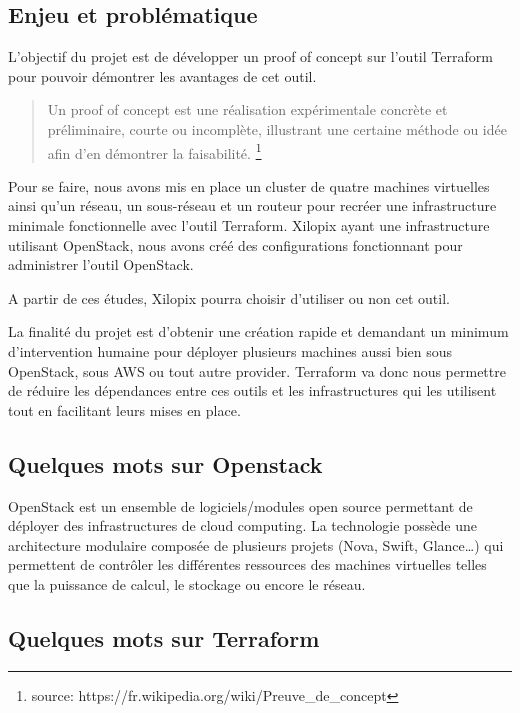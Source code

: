 \documentclass[]{article}
\begin{document}
\subsection{Enjeu et problématique}\label{enjeu-et-probluxe9matique}

L'objectif du projet est de développer un proof of concept sur l'outil
Terraform pour pouvoir démontrer les avantages de cet outil.

\begin{quote}
Un proof of concept est une réalisation expérimentale concrète et
préliminaire, courte ou incomplète, illustrant une certaine méthode ou
idée afin d'en démontrer la faisabilité. \footnote{source: https://fr.wikipedia.org/wiki/Preuve\_de\_concept}
\end{quote}

Pour se faire, nous avons mis en place un cluster de quatre machines
virtuelles ainsi qu'un réseau, un sous-réseau et un routeur pour recréer
une infrastructure minimale fonctionnelle avec l'outil Terraform.
Xilopix ayant une infrastructure utilisant OpenStack, nous avons créé
des configurations fonctionnant pour administrer l'outil OpenStack.

A partir de ces études, Xilopix pourra choisir d'utiliser ou non cet
outil.

La finalité du projet est d'obtenir une création rapide et demandant un
minimum d'intervention humaine pour déployer plusieurs machines aussi
bien sous OpenStack, sous AWS ou tout autre provider. Terraform va donc
nous permettre de réduire les dépendances entre ces outils et les
infrastructures qui les utilisent tout en facilitant leurs mises en place.

\subsection{Quelques mots sur
Openstack}\label{quelques-mots-sur-openstack}

OpenStack est un ensemble de logiciels/modules open source permettant de
déployer des infrastructures de cloud computing. La technologie possède
une architecture modulaire composée de plusieurs projets (Nova, Swift,
Glance\ldots{}) qui permettent de contrôler les différentes ressources
des machines virtuelles telles que la puissance de calcul, le stockage
ou encore le réseau.

\subsection{Quelques mots sur
Terraform}\label{quelques-mots-sur-terraform}
\end{document}
